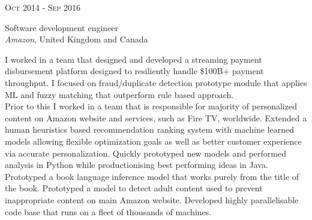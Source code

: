 \documentclass[10pt]{article} %
\begin{document}
{\begin{minipage}[t]{0.44\textwidth}

\end{minipage} %

\newpage


\begin{minipage}[t]{0.5\textwidth} %
\vspace{0pt} %



\vspace{0.5cm}
{\raggedleft\textsc{Oct 2014 - Sep 2016}\par}

{\raggedright\large Software development engineer\\
\textit{Amazon}, United Kingdom and Canada\\[5pt]}

\normalsize{I worked in a team that designed and 
developed a streaming payment disbursement 
platform designed to resiliently handle \$100B+ payment throughput. 
I focused on fraud/duplicate detection prototype module
that applies ML and fuzzy matching that outperform rule based approach.
\\

Prior to this I worked in a team that is responsible for majority of personalized 
content on Amazon website and services, such as Fire TV, worldwide.
Extended a human heuristics based recommendation
ranking system with machine learned models allowing flexible
optimization goals as well as better customer experience via accurate personalization.
Quickly prototyped new models and performed analysis in Python
while productionising best performing ideas in Java.
\\

Prototyped a book language inference model that works purely from the title of the book.
Prototyped a model to detect adult content used to prevent inappropriate content on main Amazon website.
Developed highly parallelisable code base that runs on a fleet of thousands of machines.}\\


\end{minipage}}
\end{document}
